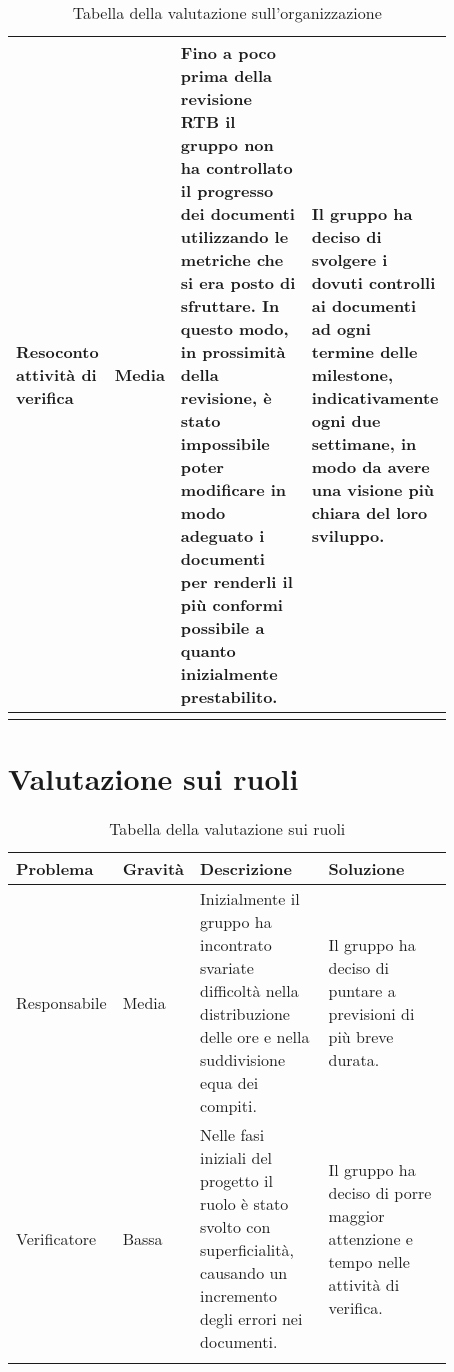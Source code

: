 \begin{center}
\begin{longtable}{|p{0.16\linewidth}|p{0.11\linewidth}|p{0.3\linewidth}|p{0.3\linewidth}|}
    \rowcolor[HTML]{C0C0C0}
    Resoconto attività di verifica & Media & Fino a poco prima della revisione RTB il gruppo non ha controllato il progresso dei documenti utilizzando le metriche che si era posto di sfruttare. In questo modo, in prossimità della revisione, è stato impossibile poter modificare in modo adeguato i documenti per renderli il più conformi possibile a quanto inizialmente prestabilito. & Il gruppo ha deciso di svolgere i dovuti controlli ai documenti ad ogni termine delle milestone, indicativamente ogni due settimane, in modo da avere una visione più chiara del loro sviluppo.\\ \hline
    \hline
    \caption{Tabella della valutazione sull'organizzazione}
    \end{longtable}
    
\end{center}

\section{Valutazione sui ruoli}
\begin{center}
    \renewcommand{\arraystretch}{1.25}
\begin{table}[H]
    \centering
    \begin{longtable}{|p{0.16\linewidth}|p{0.11\linewidth}|p{0.3\linewidth}|p{0.3\linewidth}|}
   \hline
    \rowcolor[HTML]{036400}
    {\color[HTML]{EFEFEF} \textbf{Problema}} & {\color[HTML]{EFEFEF} \textbf{Gravità}} & {\color[HTML]{EFEFEF} \textbf{Descrizione}} & {\color[HTML]{EFEFEF} \textbf{Soluzione}} \\ \hline
    \rowcolor[HTML]{EFEFEF}
    Responsabile & Media & Inizialmente il gruppo ha incontrato svariate difficoltà nella distribuzione delle ore e nella suddivisione equa dei compiti. & Il gruppo ha deciso di puntare a previsioni di più breve durata. \\ \hline
    \rowcolor[HTML]{C0C0C0}
    Verificatore & Bassa & Nelle fasi iniziali del progetto il ruolo è stato svolto con superficialità, causando un incremento degli errori nei documenti. & Il gruppo ha deciso di porre maggior attenzione e tempo nelle attività di verifica. \\ \hline
    \caption{Tabella della valutazione sui ruoli}
    \end{longtable}

\end{table}
\end{center}


